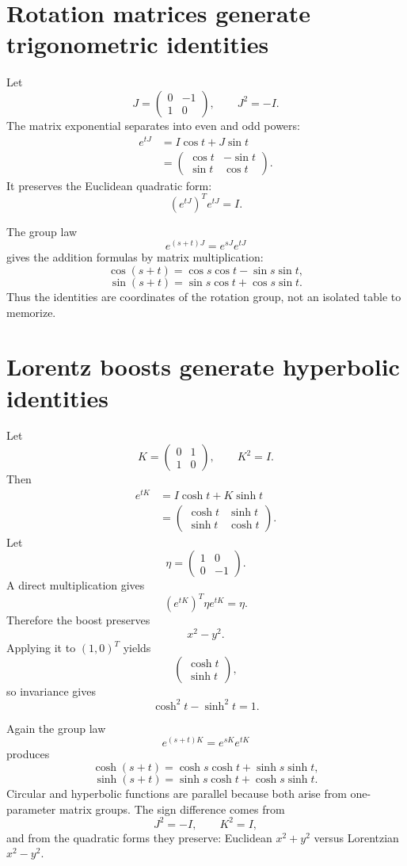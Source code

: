 \section{Rotation matrices generate trigonometric identities}

Let
\[
  J=
  \begin{pmatrix}
  0&-1\\
  1&0
  \end{pmatrix},
  \qquad
  J^2=-I.
\]
The matrix exponential separates into even and odd powers:
\[
\begin{aligned}
  e^{tJ}
  &=I\cos t+J\sin t\\
  &=
  \begin{pmatrix}
  \cos t&-\sin t\\
  \sin t&\cos t
  \end{pmatrix}.
\end{aligned}
\]
It preserves the Euclidean quadratic form:
\[
  (e^{tJ})^Te^{tJ}=I.
\]

The group law
\[
  e^{(s+t)J}=e^{sJ}e^{tJ}
\]
gives the addition formulas by matrix multiplication:
\[
  \cos(s+t)=\cos s\cos t-\sin s\sin t,
\]
\[
  \sin(s+t)=\sin s\cos t+\cos s\sin t.
\]
Thus the identities are coordinates of the rotation group, not an isolated table to memorize.

\section{Lorentz boosts generate hyperbolic identities}

Let
\[
  K=
  \begin{pmatrix}
  0&1\\
  1&0
  \end{pmatrix},
  \qquad
  K^2=I.
\]
Then
\[
\begin{aligned}
  e^{tK}
  &=I\cosh t+K\sinh t\\
  &=
  \begin{pmatrix}
  \cosh t&\sinh t\\
  \sinh t&\cosh t
  \end{pmatrix}.
\end{aligned}
\]
Let
\[
  \eta=
  \begin{pmatrix}
  1&0\\
  0&-1
  \end{pmatrix}.
\]
A direct multiplication gives
\[
  (e^{tK})^T\eta e^{tK}=\eta.
\]
Therefore the boost preserves
\[
  x^2-y^2.
\]
Applying it to \((1,0)^T\) yields
\[
  \begin{pmatrix}\cosh t\\\sinh t\end{pmatrix},
\]
so invariance gives
\[
  \boxed{\cosh^2t-\sinh^2t=1.}
\]

Again the group law
\[
  e^{(s+t)K}=e^{sK}e^{tK}
\]
produces
\[
  \cosh(s+t)=\cosh s\cosh t+\sinh s\sinh t,
\]
\[
  \sinh(s+t)=\sinh s\cosh t+\cosh s\sinh t.
\]
Circular and hyperbolic functions are parallel because both arise from one-parameter matrix groups.  The sign difference comes from
\[
  J^2=-I,
  \qquad
  K^2=I,
\]
and from the quadratic forms they preserve: Euclidean \(x^2+y^2\) versus Lorentzian \(x^2-y^2\).
